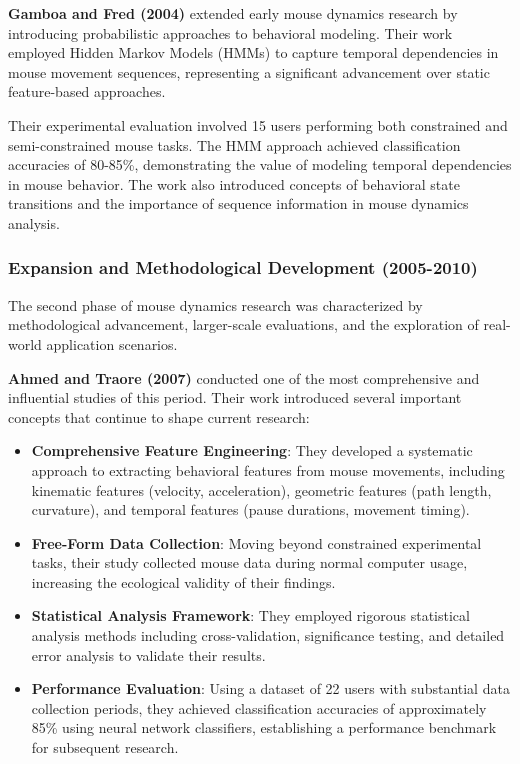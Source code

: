 \documentclass[
  12pt,
  a4paper,
]{report}
\begin{document}
\textbf{Gamboa and Fred (2004)} extended early mouse dynamics research
by introducing probabilistic approaches to behavioral modeling. Their
work employed Hidden Markov Models (HMMs) to capture temporal
dependencies in mouse movement sequences, representing a significant
advancement over static feature-based approaches.

Their experimental evaluation involved 15 users performing both
constrained and semi-constrained mouse tasks. The HMM approach achieved
classification accuracies of 80-85\%, demonstrating the value of
modeling temporal dependencies in mouse behavior. The work also
introduced concepts of behavioral state transitions and the importance
of sequence information in mouse dynamics analysis.

\subsubsection{Expansion and Methodological Development
(2005-2010)}\label{expansion-and-methodological-development-2005-2010}

The second phase of mouse dynamics research was characterized by
methodological advancement, larger-scale evaluations, and the
exploration of real-world application scenarios.

\textbf{Ahmed and Traore (2007)} conducted one of the most comprehensive
and influential studies of this period. Their work introduced several
important concepts that continue to shape current research:

\begin{itemize}
\item
  \textbf{Comprehensive Feature Engineering}: They developed a
  systematic approach to extracting behavioral features from mouse
  movements, including kinematic features (velocity, acceleration),
  geometric features (path length, curvature), and temporal features
  (pause durations, movement timing).
\item
  \textbf{Free-Form Data Collection}: Moving beyond constrained
  experimental tasks, their study collected mouse data during normal
  computer usage, increasing the ecological validity of their findings.
\item
  \textbf{Statistical Analysis Framework}: They employed rigorous
  statistical analysis methods including cross-validation, significance
  testing, and detailed error analysis to validate their results.
\item
  \textbf{Performance Evaluation}: Using a dataset of 22 users with
  substantial data collection periods, they achieved classification
  accuracies of approximately 85\% using neural network classifiers,
  establishing a performance benchmark for subsequent research.
\end{itemize}
\end{document}
